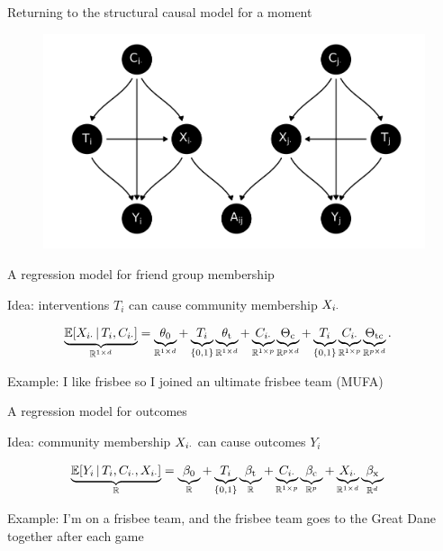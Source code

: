 \documentclass{beamer}
\theoremstyle{remark}
\begin{document}
\begin{frame}{Returning to the structural causal model for a moment}

    \centering

    \begin{figure}
        \includegraphics[scale=0.65]{figures/dags/mediating-5.png}
        \label{fig:mediating-5-again}
    \end{figure}

\end{frame}

\begin{frame}{A regression model for friend group membership}

    Idea: interventions $T_i$ can cause community membership $X_{i \cdot}$

    \begin{align*}
        \underbrace{\E[T_i, \C_{i \cdot}]{\X_{i \cdot}}}_{\R^{1 \times d}}
         & = \underbrace{\thetazero}_{\R^{1 \times d}}
        + \underbrace{T_i}_{\{0, 1\}} \underbrace{\thetat}_{\R^{1 \times d}}
        + \underbrace{\C_{i \cdot}}_{\R^{1 \times p}} \underbrace{\Thetac}_{\R^{p \times d}}
        + \underbrace{T_i}_{\{0, 1\}} \underbrace{\C_{i \cdot}}_{\R^{1 \times p}} \underbrace{\Thetatc}_{\R^{p \times d}}.
    \end{align*}

    Example: I like frisbee so I joined an ultimate frisbee team (MUFA)

\end{frame}

\begin{frame}{A regression model for outcomes}

    Idea: community membership $X_{i \cdot}$ can cause outcomes $Y_i$

    \begin{align*}
        \underbrace{\E[T_i, \C_{i \cdot}, \X_{i \cdot}]{Y_i}}_{\R}
         & = \underbrace{\betazero}_{\R}
        + \underbrace{T_i}_{\{0, 1\}} \underbrace{\betat}_{\R}
        + \underbrace{\C_{i \cdot}}_{\R^{1 \times p}} \underbrace{\betac}_{\R^{p}}
        + \underbrace{\X_{i \cdot}}_{\R^{1 \times d}} \underbrace{\betax}_{\R^d}
    \end{align*}

    Example: I'm on a frisbee team, and the frisbee team goes to the Great Dane together after each game

\end{frame}
\end{document}
